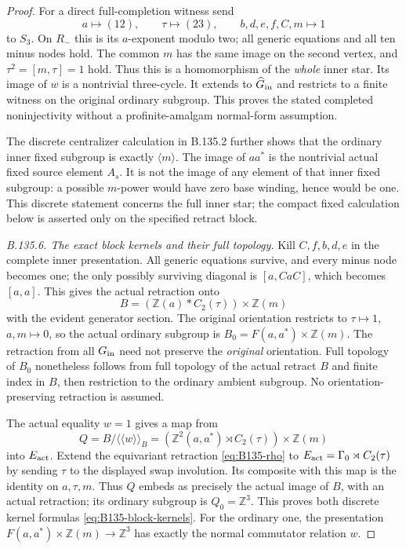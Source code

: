 \begin{proof}
For a direct full-completion witness send
\[
 a\longmapsto(12),\qquad\tau\longmapsto(23),\qquad
 b,d,e,f,C,m\longmapsto1
\]
to $S_3$. On $R_-$ this is its $a$-exponent modulo two;
all generic equations and all ten minus nodes hold. The
common $m$ has the same image on the second vertex, and
$\tau^2=[m,\tau]=1$ hold. Thus this is a homomorphism of
the \emph{whole} inner star. Its image of $w$ is a nontrivial
three-cycle. It extends to $\widehat G_{\rm in}$ and restricts
to a finite witness on the original ordinary subgroup.
This proves the stated completed noninjectivity without a
profinite-amalgam normal-form assumption.

The discrete centralizer calculation in B.135.2 further shows
that the ordinary inner fixed subgroup is exactly $\langle m\rangle$.
The image of $aa^*$ is the nontrivial actual fixed source
element $A_s$. It is not the image of any element of that
inner fixed subgroup: a possible $m$-power would have zero
base winding, hence would be one. This discrete statement
concerns the full inner star; the compact fixed calculation
below is asserted only on the specified retract block.

\emph{B.135.6. The exact block kernels and their full topology.}
Kill $C,f,b,d,e$ in the complete inner presentation. All
generic equations survive, and every minus node becomes one;
the only possibly surviving diagonal is $[a,CaC]$, which
becomes $[a,a]$. This gives the actual retraction onto
\[
 B=(\mathbb Z(a)*C_2(\tau))\times\mathbb Z(m)
\]
with the evident generator section. The original orientation
restricts to $\tau\mapsto1$, $a,m\mapsto0$, so the actual
ordinary subgroup is $B_0=F(a,a^*)\times\mathbb Z(m)$.
The retraction from all $G_{\rm in}$ need not preserve the
\emph{original} orientation. Full topology of $B_0$ nonetheless
follows from full topology of the actual retract $B$ and
finite index in $B$, then restriction to the ordinary ambient
subgroup. No orientation-preserving retraction is assumed.

The actual equality $w=1$ gives a map from
\[
 Q=B/\langle\!\langle w\rangle\!\rangle_B
   =(\mathbb Z^2(a,a^*)\rtimes C_2(\tau))\times\mathbb Z(m)
\]
into $E_{\rm act}$. Extend the equivariant retraction
\eqref{eq:B135-rho} to $E_{\rm act}=\Gamma_0\rtimes C_2(\tau)$
by sending $\tau$ to the displayed swap involution. Its
composite with this map is the identity on $a,\tau,m$.
Thus $Q$ embeds as precisely the actual image of $B$, with
an actual retraction; its ordinary subgroup is $Q_0=\mathbb Z^3$.
This proves both discrete kernel formulas
\eqref{eq:B135-block-kernels}. For the ordinary one, the
presentation $F(a,a^*)\times\mathbb Z(m)\to\mathbb Z^3$
has exactly the normal commutator relation $w$.


\end{proof}
